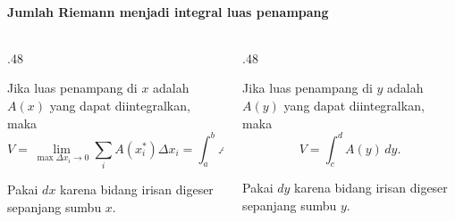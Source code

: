 \documentclass{../../kalkulus-ppt}
\begin{document}
\begin{frame}{\insertsection}
    \framesubtitle{Jumlah Riemann menjadi integral luas penampang}
    \begin{columns}[t,onlytextwidth]
        \begin{column}{.48\textwidth}
            \begin{definisi}
                Jika luas penampang di $x$ adalah $A(x)$ yang
                dapat diintegralkan, maka
                \[
                    V=\lim_{\max\Delta x_i\to0}\sum_i A(x_i^*)\Delta x_i
                     =\int_a^b A(x)\,dx.
                \]
            \end{definisi}
            Pakai $dx$ karena bidang irisan digeser sepanjang sumbu $x$.
        \end{column}
        \begin{column}{.48\textwidth}
            \begin{definisi}
                Jika luas penampang di $y$ adalah $A(y)$ yang
                dapat diintegralkan, maka
                \[
                    V=\int_c^d A(y)\,dy.
                \]
            \end{definisi}
            Pakai $dy$ karena bidang irisan digeser sepanjang sumbu $y$.
        \end{column}
    \end{columns}
\end{frame}
\end{document}
